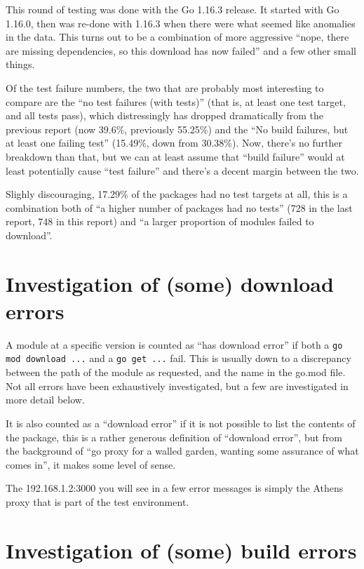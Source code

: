 \documentclass[a4paper]{paper}
\begin{document}
This round of testing was done with the Go 1.16.3 release. It started
with Go 1.16.0, then was re-done with 1.16.3 when there were what
seemed like anomalies in the data. This turns out to be a combination
of more aggressive ``nope, there are missing dependencies, so this
download has now failed'' and a few other small things.


Of the test failure numbers, the two that are probably most
interesting to compare are the ``no test failures (with tests)'' (that
is, at least one test target, and all tests pass), which distressingly
has dropped dramatically from the previous report (now 39.6\%,
previously 55.25\%) and the ``No build failures, but at least one
failing test'' (15.49\%, down from 30.38\%). Now, there's no further
breakdown than that, but we can at least assume that ``build failure''
would at least potentially cause ``test failure'' and there's a decent
margin between the two.

Slighly discouraging, 17.29\% of the packages had no test targets at
all, this is a combination both of ``a higher number of packages had
no tests'' (728 in the last report, 748 in this report) and ``a larger
proportion of modules failed to download''.

\section{Investigation of (some) download errors}

A module at a specific version is counted as ``has download error'' if
both a {\tt go mod download ...} and a {\tt go get ...} fail. This is
usually down to a discrepancy between the path of the module as
requested, and the name in the go.mod file. Not all errors have been
exhaustively investigated, but a few are investigated in more detail
below.

It is also counted as a ``download error'' if it is not possible to
list the contents of the package, this is a rather generous definition
of ``download error'', but from the background of ``go proxy for a
walled garden, wanting some assurance of what comes in'', it makes
some level of sense.

The 192.168.1.2:3000 you will see in a few error messages is simply
the Athens proxy that is part of the test environment.




\section{Investigation of (some) build errors}
\end{document}
